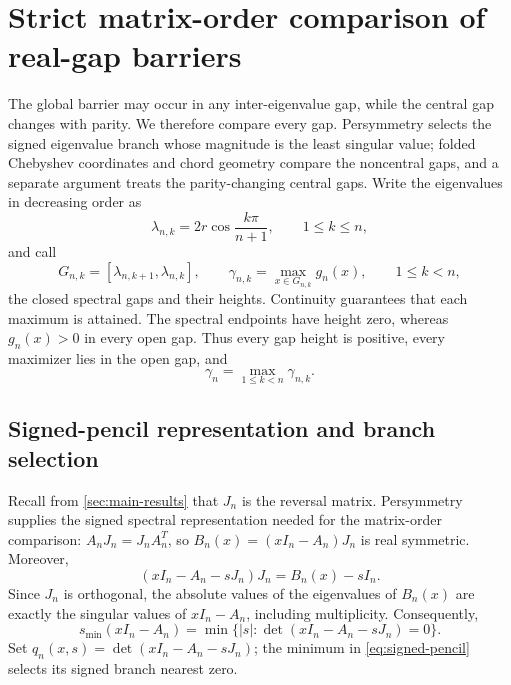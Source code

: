 \documentclass[10pt,twoside]{siamart1116}
\numberwithin{equation}{section}
\begin{document}
\section{Strict matrix-order comparison of real-gap barriers}
\label{sec:mesh}

The global barrier may occur in any inter-eigenvalue gap, while the central
gap changes with parity.  We therefore compare every gap.  Persymmetry
selects the signed eigenvalue branch whose magnitude is the least singular
value; folded Chebyshev coordinates and chord geometry compare the
noncentral gaps, and a separate argument treats the parity-changing central
gaps.  Write the eigenvalues in decreasing order as
\[
 \lambda_{n,k}=2r\cos\frac{k\pi}{n+1},\qquad 1\leq k\leq n,
\]
and call
\[
 G_{n,k}=[\lambda_{n,k+1},\lambda_{n,k}],\qquad
 \gamma_{n,k}=\max_{x\in G_{n,k}}g_n(x),\qquad 1\leq k<n,
\]
the closed spectral gaps and their heights.  Continuity guarantees that each
maximum is attained.  The spectral endpoints have height zero, whereas
\(g_n(x)>0\) in every open gap.  Thus every gap height is positive, every
maximizer lies in the open gap, and
\begin{equation}\label{eq:gamma-def}
 \gamma_n=\max_{1\leq k<n}\gamma_{n,k}.
\end{equation}

\subsection{Signed-pencil representation and branch selection}
\label{subsec:signed-pencil}

Recall from \cref{sec:main-results} that \(J_n\) is the reversal matrix.
Persymmetry supplies the signed spectral representation needed for the
matrix-order comparison:
\(A_nJ_n=J_nA_n^T\), so
\(B_n(x)=(xI_n-A_n)J_n\) is real symmetric.  Moreover,
\[
 (xI_n-A_n-sJ_n)J_n=B_n(x)-sI_n.
\]
Since \(J_n\) is orthogonal, the absolute values of the eigenvalues of \(B_n(x)\)
are exactly the singular values of \(xI_n-A_n\), including multiplicity.
Consequently,
\begin{equation}\label{eq:signed-pencil}
 s_{\min}(xI_n-A_n)
 =\min\{|s|:\det(xI_n-A_n-sJ_n)=0\}.
\end{equation}
Set \(q_n(x,s)=\det(xI_n-A_n-sJ_n)\); the minimum in
\eqref{eq:signed-pencil} selects its signed branch nearest zero.
\end{document}
